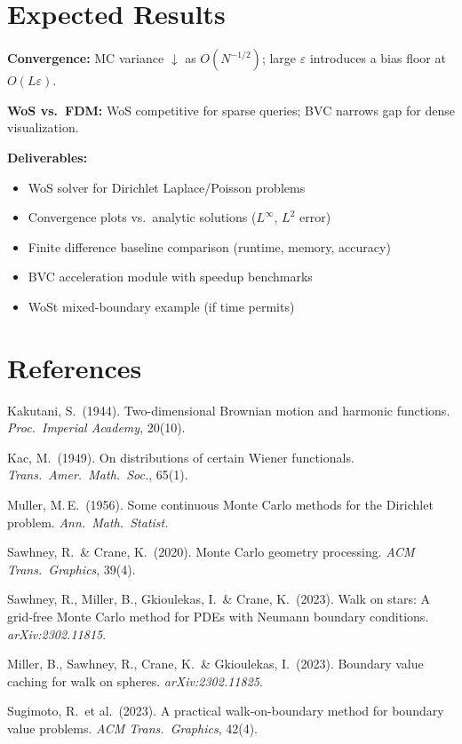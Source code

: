 \documentclass[11pt]{article}
\begin{document}
\section{Expected Results}

\begin{tcolorbox}[colback=lightbg,colframe=accent,boxrule=0.5pt,arc=2pt,left=6pt,right=6pt,top=4pt,bottom=4pt]
\textbf{Convergence:} MC variance $\downarrow$ as $O(N^{-1/2})$; large $\varepsilon$ introduces a bias floor at $O(L\varepsilon)$.

\textbf{WoS vs.\ FDM:} WoS competitive for sparse queries; BVC narrows gap for dense visualization.

\textbf{Deliverables:}
\end{tcolorbox}

\begin{itemize}
  \item WoS solver for Dirichlet Laplace/Poisson problems
  \item Convergence plots vs.\ analytic solutions ($L^\infty$, $L^2$ error)
  \item Finite difference baseline comparison (runtime, memory, accuracy)
  \item BVC acceleration module with speedup benchmarks
  \item WoSt mixed-boundary example (if time permits)
\end{itemize}

\section{References}

\begin{enumerate}[topsep=2pt,itemsep=1pt,leftmargin=12pt,label={[\arabic*]}]
  \item Kakutani, S.\ (1944). Two-dimensional Brownian motion and harmonic functions. \textit{Proc.\ Imperial Academy}, 20(10).
  \item Kac, M.\ (1949). On distributions of certain Wiener functionals. \textit{Trans.\ Amer.\ Math.\ Soc.}, 65(1).
  \item Muller, M.\,E.\ (1956). Some continuous Monte Carlo methods for the Dirichlet problem. \textit{Ann.\ Math.\ Statist.}
  \item Sawhney, R.\ \& Crane, K.\ (2020). Monte Carlo geometry processing. \textit{ACM Trans.\ Graphics}, 39(4).
  \item Sawhney, R., Miller, B., Gkioulekas, I.\ \& Crane, K.\ (2023). Walk on stars: A grid-free Monte Carlo method for PDEs with Neumann boundary conditions. \textit{arXiv:2302.11815}.
  \item Miller, B., Sawhney, R., Crane, K.\ \& Gkioulekas, I.\ (2023). Boundary value caching for walk on spheres. \textit{arXiv:2302.11825}.
  \item Sugimoto, R.\ et al.\ (2023). A practical walk-on-boundary method for boundary value problems. \textit{ACM Trans.\ Graphics}, 42(4).
\end{enumerate}
\end{document}
